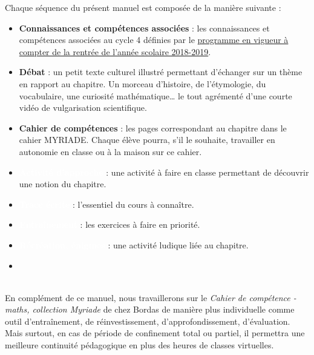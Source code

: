 Chaque séquence du présent manuel est composée de la manière suivante : \\
\begin{itemize}
   \item \textcolor{B2}{\sffamily\bfseries Connaissances et compétences associées} : les connaissances et compétences associées au cycle 4 définies par le \href{https://cache.media.eduscol.education.fr/file/A-Scolarite_obligatoire/37/5/Programme2020_cycle_3_comparatif_1313375.pdf}{programme en vigueur à compter de la rentrée de l'année scolaire 2018-2019}. \\
   \item \textcolor{C1}{\sffamily\bfseries Débat} : un petit texte culturel illustré permettant d'échanger sur un thème en rapport au chapitre. Un morceau d'histoire, de l'étymologie, du vocabulaire, une curiosité mathématique\dots{} le tout agrémenté d'une courte vidéo de vulgarisation scientifique. \\
   \item \textcolor{PartieGeometrie}{\sffamily\bfseries Cahier de compétences} : les pages correspondant au chapitre dans le cahier MYRIADE. Chaque élève pourra, s'il le souhaite, travailler en autonomie en classe ou à la maison sur ce cahier. \\
   \item \colorbox{G2}{\textcolor{white}{\sffamily\bfseries Activité d'approche}} : une activité à faire en classe permettant de découvrir une notion du chapitre. \\
   \item \colorbox{A2}{\textcolor{white}{\sffamily\bfseries Trace écrite}} : l'essentiel du cours à connaître. \\
   \item \colorbox{C2}{\textcolor{white}{\sffamily\bfseries Entraînement}} : les exercices à faire en priorité.  \\   
   \item \colorbox{PartieStatistique}{\textcolor{white}{\sffamily\bfseries Récréation, énigmes}} : une activité ludique liée au chapitre.
   \item
\end{itemize}

\ \\ [10mm]

En complément de ce manuel, nous travaillerons sur le {\it Cahier de compétence - maths, collection Myriade} de chez Bordas de manière plus individuelle comme outil d'entraînement, de réinvestissement, d'approfondissement, d'évaluation. Mais surtout, en cas de période de confinement total ou partiel, il permettra une meilleure continuité pédagogique en plus des heures de classes virtuelles.

